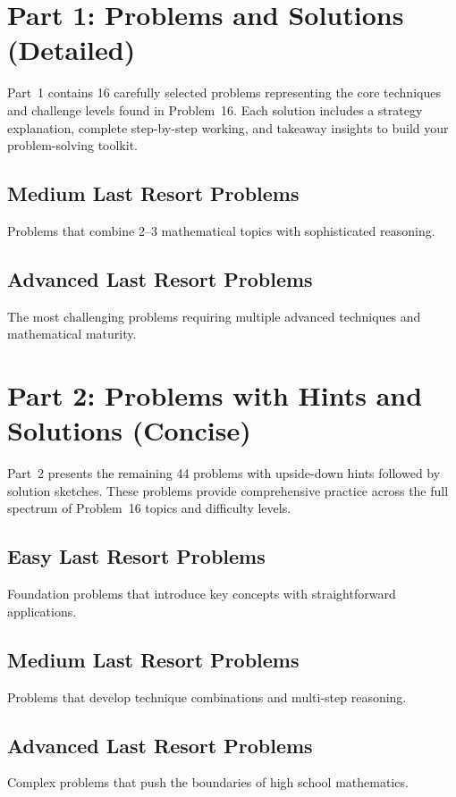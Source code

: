 \documentclass[12pt]{article}
\begin{document}
\newpage
\section{Part 1: Problems and Solutions (Detailed)}
Part~1 contains 16 carefully selected problems representing the core techniques and challenge levels found in Problem~16. Each solution includes a strategy explanation, complete step-by-step working, and takeaway insights to build your problem-solving toolkit.

\subsection{Medium Last Resort Problems}
Problems that combine 2--3 mathematical topics with sophisticated reasoning.



\subsection{Advanced Last Resort Problems}
The most challenging problems requiring multiple advanced techniques and mathematical maturity.



\newpage
\section{Part 2: Problems with Hints and Solutions (Concise)}
Part~2 presents the remaining 44 problems with upside-down hints followed by solution sketches. These problems provide comprehensive practice across the full spectrum of Problem~16 topics and difficulty levels.

\subsection{Easy Last Resort Problems}
Foundation problems that introduce key concepts with straightforward applications.



\subsection{Medium Last Resort Problems}
Problems that develop technique combinations and multi-step reasoning.



\subsection{Advanced Last Resort Problems}
Complex problems that push the boundaries of high school mathematics.
\end{document}
